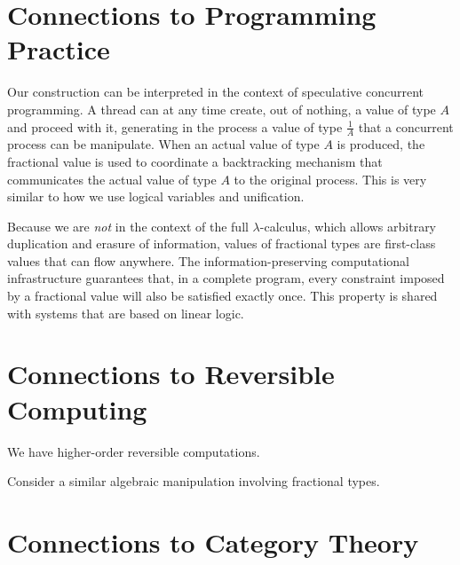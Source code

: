 \documentclass[11pt]{article}
\begin{document}
\section{Connections to Programming Practice} 

Our construction can be interpreted in the context of speculative concurrent
programming. A thread can at any time create, out of nothing, a value of type
$A$ and proceed with it, generating in the process a value of type
$\frac{1}{A}$ that a concurrent process can be manipulate. When an actual
value of type $A$ is produced, the fractional value is used to coordinate a
backtracking mechanism that communicates the actual value of type $A$ to the
original process. This is very similar to how we use logical variables and
unification.

Because we are \emph{not} in the context of the full $\lambda$-calculus,
which allows arbitrary duplication and erasure of information, values of
fractional types are first-class values that can flow anywhere. The
information-preserving computational infrastructure guarantees that, in a
complete program, every constraint imposed by a fractional value will also be
satisfied exactly once. This property is shared with systems that are based
on linear logic.

\section{Connections to Reversible Computing}

We have higher-order reversible computations.

Consider a similar algebraic manipulation involving fractional types.
\begin{center}
\end{center}

\section{Connections to Category Theory} 
\end{document}
